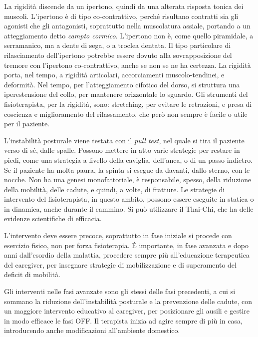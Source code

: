 La rigidità discende da un ipertono, quindi da una alterata risposta tonica dei 
muscoli. L'ipertono è di tipo co-contrattivo, perché risultano contratti sia 
gli agonisti che gli antagonisti, soprattutto nella muscolatura assiale, 
portando a un atteggiamento detto \textit{campto cormico}. L'ipertono non è, 
come quello piramidale, a serramanico, ma a dente di sega, o a troclea dentata.
Il tipo particolare di rilasciamento dell'ipertono potrebbe essere dovuto alla
sovrapposizione del tremore con l'ipertono co-contrattivo, anche se non se ne ha
certezza.
La rigidità porta, nel tempo, a rigidità articolari, accorciamenti
muscolo-tendinei, e deformità. Nel tempo, per l'atteggiamento cifotico del
dorso, si struttura una iperestensione del collo, per mantenere orizzontale lo
sguardo. Gli strumenti del fisioterapista, per la rigidità, sono: stretching,
per evitare le retrazioni, e presa di coscienza e miglioramento del
rilassamento, che però non sempre è facile o utile per il paziente.

L'instabilità posturale viene testata con il \textit{pull test}, nel quale si 
tira il paziente verso di sé, dalle spalle. Possono mettere in atto varie 
strategie per restare in piedi, come una strategia a livello della caviglia, 
dell'anca, o di un passo indietro. Se il paziente ha molta paura, la spinta si 
esegue da davanti, dallo sterno, con le nocche. Non ha una genesi 
monofattoriale, è responsabile, spesso, della riduzione della mobilità, delle 
cadute, e quindi, a volte, di fratture.
Le strategie di intervento del fisioterapista, in questo ambito, possono essere 
eseguite in statica o in dinamica, anche durante il cammino. Si può 
utilizzare il Thai-Chi, che ha delle evidenze scientifiche di efficacia.

L'intervento deve essere precoce, soprattutto in fase iniziale si procede con 
esercizio fisico, non per forza fisioterapia. \'E importante, in fase avanzata 
e dopo anni dall'esordio della malattia, procedere sempre più all'educazione 
terapeutica del caregiver, per insegnare strategie di mobilizzazione e di 
superamento del deficit di mobilità. 

Gli interventi nelle fasi avanzate sono gli stessi delle fasi precedenti, a cui 
si sommano la riduzione dell'instabilità posturale e la prevenzione delle 
cadute, con un maggiore intervento educativo al caregiver, per posizionare gli 
ausili e gestire in modo efficace le fasi OFF. Il terapista inizia ad agire 
sempre di più in casa, introducendo anche modificazioni all'ambiente domestico.


